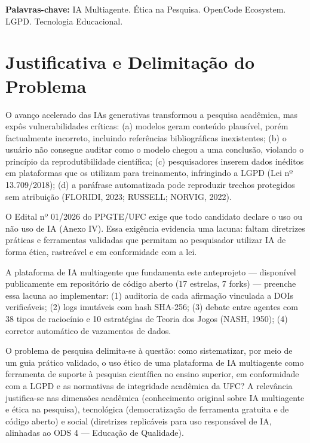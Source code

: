 \documentclass[12pt,a4paper]{article}
\begin{document}
\vspace{0.5cm}
\noindent\textbf{Palavras-chave:} IA Multiagente. Ética na Pesquisa. OpenCode Ecosystem. LGPD. Tecnologia Educacional.

\section{Justificativa e Delimitação do Problema}

O avanço acelerado das IAs generativas transformou a pesquisa acadêmica, mas expôs vulnerabilidades críticas: (a) modelos geram conteúdo plausível, porém factualmente incorreto, incluindo referências bibliográficas inexistentes; (b) o usuário não consegue auditar como o modelo chegou a uma conclusão, violando o princípio da reprodutibilidade científica; (c) pesquisadores inserem dados inéditos em plataformas que os utilizam para treinamento, infringindo a LGPD (Lei nº 13.709/2018); (d) a paráfrase automatizada pode reproduzir trechos protegidos sem atribuição (FLORIDI, 2023; RUSSELL; NORVIG, 2022).

O Edital nº 01/2026 do PPGTE/UFC exige que todo candidato declare o uso ou não uso de IA (Anexo IV). Essa exigência evidencia uma lacuna: faltam diretrizes práticas e ferramentas validadas que permitam ao pesquisador utilizar IA de forma ética, rastreável e em conformidade com a lei.

A plataforma de IA multiagente que fundamenta este anteprojeto --- disponível publicamente em repositório de código aberto (17 estrelas, 7 forks) --- preenche essa lacuna ao implementar: (1) auditoria de cada afirmação vinculada a DOIs verificáveis; (2) logs imutáveis com hash SHA-256; (3) debate entre agentes com 38 tipos de raciocínio e 10 estratégias de Teoria dos Jogos (NASH, 1950); (4) corretor automático de vazamentos de dados.

O problema de pesquisa delimita-se à questão: como sistematizar, por meio de um guia prático validado, o uso ético de uma plataforma de IA multiagente como ferramenta de suporte à pesquisa científica no ensino superior, em conformidade com a LGPD e as normativas de integridade acadêmica da UFC? A relevância justifica-se nas dimensões acadêmica (conhecimento original sobre IA multiagente e ética na pesquisa), tecnológica (democratização de ferramenta gratuita e de código aberto) e social (diretrizes replicáveis para uso responsável de IA, alinhadas ao ODS 4 --- Educação de Qualidade).
\end{document}
